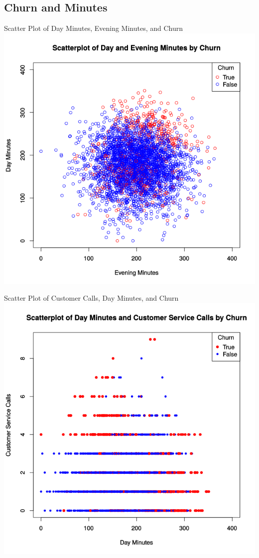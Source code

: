\documentclass[handout]{beamer}
\begin{document}
\subsection{Churn and Minutes}
\begin{frame}{Scatter Plot of Day Minutes, Evening Minutes, and Churn}
    \centering
    \includegraphics[height=0.8\textheight]{images/scatter-minutes}
\end{frame}

\begin{frame}{Scatter Plot of Customer Calls, Day Minutes, and Churn}
    \centering
    \includegraphics[height=0.8\textheight]{images/scatter-minutes-calls}
\end{frame}
\end{document}
